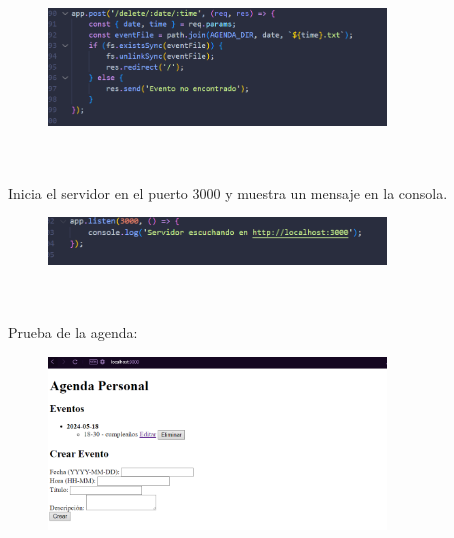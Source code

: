\documentclass{article}
\begin{document}
     \begin{figure}[H]
		          \centering
		          \includegraphics[width=0.8\textwidth,keepaspectratio]                       {img/eliEv.png}
    \end{figure}  
\\
\\Inicia el servidor en el puerto 3000 y muestra un mensaje en la consola.


 \begin{figure}[H]
		          \centering
		          \includegraphics[width=0.8\textwidth,keepaspectratio]                       {img/iniSer.png}
    \end{figure}  
\\

\\Prueba de la agenda:

\begin{figure}[H]
		          \centering
		          \includegraphics[width=0.8\textwidth,keepaspectratio]                       {img/pruebaAg.png}
    \end{figure}  
\\
\end{document}
